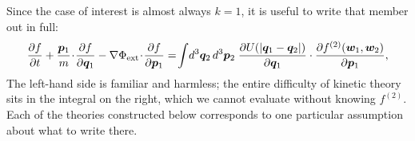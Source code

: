 \documentclass[12pt]{article}
\renewcommand{\vec}[1]{\bm{#1}}
\begin{document}
Since the case of interest is almost always $k=1$, it is useful to
write that member out in full:
%
\begin{equation}
  \frac{\partial f}{\partial t}
   + \frac{\vec p_1}{m}\!\cdot\!\frac{\partial f}{\partial\vec q_1}
   - \nabla\Phi_{\rm ext}\!\cdot\!\frac{\partial f}{\partial\vec p_1}
   = \!\int\! d^3\vec q_2\,d^3\vec p_2\;
     \frac{\partial U(|\vec q_1-\vec q_2|)}{\partial\vec q_1}
     \cdot\frac{\partial f^{(2)}(\vec w_1,\vec w_2)}{\partial\vec p_1},
  \label{eq:bbgky1}
\end{equation}
%
The left-hand side is familiar and harmless; the entire difficulty of
kinetic theory sits in the integral on the right, which we cannot
evaluate without knowing $f^{(2)}$.  Each of the theories constructed
below corresponds to one particular assumption about what to write
there.
\end{document}
